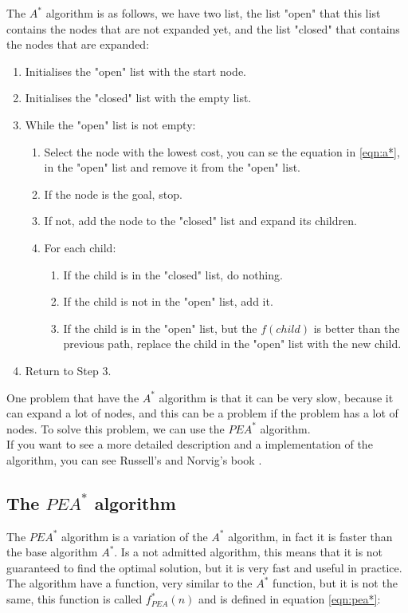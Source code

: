 \documentclass[runningheads]{llncs}
\begin{document}
The \(A^*\) algorithm is as follows, we have two list, the list "open" that this list contains the nodes that are not expanded yet, and the list "closed" that contains the nodes that are expanded:

\begin{enumerate}
\item Initialises the "open" list with the start node.
\item Initialises the "closed" list with the empty list.
\item While the "open" list is not empty:
\begin{enumerate}
\item Select the node with the lowest cost, you can se the equation in \ref{eqn:a*}, in the "open" list and remove it from the "open" list.
\item If the node is the goal, stop.
\item If not, add the node to the "closed" list and expand its children.
\item For each child:
\begin{enumerate}
\item If the child is in the "closed" list, do nothing.
\item If the child is not in the "open" list, add it.
\item If the child is in the "open" list, but the \(f(child)\) is better than the previous path, replace the child in the "open" list with the new child.
\end{enumerate}
\end{enumerate}
\item Return to Step 3.
\end{enumerate}

One problem that have the \(A^*\) algorithm is that it can be very slow, because it can expand a lot of nodes, and this can be a problem if the problem has a lot of nodes. To solve this problem, we can use the $PEA^*$ algorithm.\\
If you want to see a more detailed description and a implementation of the algorithm, you can see Russell's and Norvig's book \cite{algorithms_2}.

\subsection{The \(PEA^*\) algorithm}
The \(PEA^*\) algorithm is a variation of the \(A^*\) algorithm, in fact it is faster than the base algorithm \(A^*\).
Is a not admitted algorithm, this means that it is not guaranteed to find the optimal solution, but it is very fast and useful in practice.
The algorithm have a function, very similar to the \(A^*\) function, but it is not the same, this function is called \(f_{PEA}^*(n)\) and is defined in equation \ref{eqn:pea*}:
\end{document}
